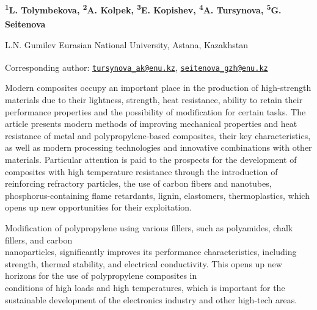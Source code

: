 
\begin{articleheader}

{\bfseries
\textsuperscript{1}L. Tolymbekova,
\textsuperscript{2}A. Kolpek,
\textsuperscript{3}E. Kopishev,
\textsuperscript{4}A. Tursynova\textsuperscript{\envelope },
\textsuperscript{5}G. Seitenova\textsuperscript{\envelope }
}
\end{articleheader}

\begin{affiliation}
L.N. Gumilev Eurasian National University, Astana, Kazakhstan

\raggedright \textsuperscript{\envelope }Corresponding author:
\href{mailto:tursynova\_ak@enu.kz}{\nolinkurl{tursynova\_ak@enu.kz}},
\href{mailto:seitenova\_gzh@enu.kz}{\nolinkurl{seitenova\_gzh@enu.kz}}
\end{affiliation}

Modern composites occupy an important place in the production of
high-strength materials due to their lightness, strength, heat
resistance, ability to retain their performance properties and the
possibility of modification for certain tasks. The article presents
modern methods of improving mechanical properties and heat resistance of
metal and polypropylene-based composites, their key characteristics, as
well as modern processing technologies and innovative combinations with
other materials. Particular attention is paid to the prospects for the
development of composites with high temperature resistance through the
introduction of reinforcing refractory particles, the use of carbon
fibers and nanotubes, phosphorus-containing flame retardants, lignin,
elastomers, thermoplastics, which opens up new opportunities for their
exploitation.

Modification of polypropylene using various fillers, such as polyamides,
chalk fillers, and carbon \\nanoparticles, significantly improves its
performance characteristics, including strength, thermal stability, and
electrical conductivity. This opens up new horizons for the use of
polypropylene composites in \\conditions of high loads and high
temperatures, which is important for the sustainable development of the
electronics industry and other high-tech areas.

